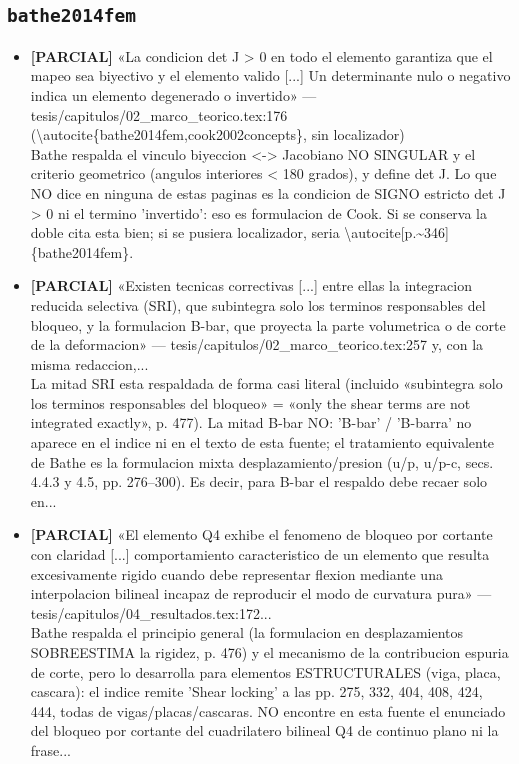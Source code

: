 \documentclass[11pt,a4paper]{article}
\newcommand{\campo}[1]{\textcolor{gris}{\footnotesize #1}}
\begin{document}
\subsection{\texttt{bathe2014fem}}
\begin{itemize}\small
\item \textbf{[PARCIAL]} «La condicion det J \textgreater{} 0 en todo el elemento garantiza que el mapeo sea biyectivo y el elemento valido [...] Un determinante nulo o negativo indica un elemento degenerado o invertido» --- tesis/capitulos/02\_marco\_teorico.tex:176 (\textbackslash{}autocite\{bathe2014fem,cook2002concepts\}, sin localizador)
\\ \campo{Bathe respalda el vinculo biyeccion \textless{}-\textgreater{} Jacobiano NO SINGULAR y el criterio geometrico (angulos interiores \textless{} 180 grados), y define det J. Lo que NO dice en ninguna de estas paginas es la condicion de SIGNO estricto det J \textgreater{} 0 ni el termino 'invertido': eso es formulacion de Cook. Si se conserva la doble cita esta bien; si se pusiera localizador, seria \textbackslash{}autocite[p.\textasciitilde{}346]\{bathe2014fem\}.}
\item \textbf{[PARCIAL]} «Existen tecnicas correctivas [...] entre ellas la integracion reducida selectiva (SRI), que subintegra solo los terminos responsables del bloqueo, y la formulacion B-bar, que proyecta la parte volumetrica o de corte de la deformacion» --- tesis/capitulos/02\_marco\_teorico.tex:257 y, con la misma redaccion,...
\\ \campo{La mitad SRI esta respaldada de forma casi literal (incluido «subintegra solo los terminos responsables del bloqueo» = «only the shear terms are not integrated exactly», p. 477). La mitad B-bar NO: 'B-bar' / 'B-barra' no aparece en el indice ni en el texto de esta fuente; el tratamiento equivalente de Bathe es la formulacion mixta desplazamiento/presion (u/p, u/p-c, secs. 4.4.3 y 4.5, pp. 276--300). Es decir, para B-bar el respaldo debe recaer solo en...}
\item \textbf{[PARCIAL]} «El elemento Q4 exhibe el fenomeno de bloqueo por cortante con claridad [...] comportamiento caracteristico de un elemento que resulta excesivamente rigido cuando debe representar flexion mediante una interpolacion bilineal incapaz de reproducir el modo de curvatura pura» --- tesis/capitulos/04\_resultados.tex:172...
\\ \campo{Bathe respalda el principio general (la formulacion en desplazamientos SOBREESTIMA la rigidez, p. 476) y el mecanismo de la contribucion espuria de corte, pero lo desarrolla para elementos ESTRUCTURALES (viga, placa, cascara): el indice remite 'Shear locking' a las pp. 275, 332, 404, 408, 424, 444, todas de vigas/placas/cascaras. NO encontre en esta fuente el enunciado del bloqueo por cortante del cuadrilatero bilineal Q4 de continuo plano ni la frase...}

\end{itemize}
\end{document}
